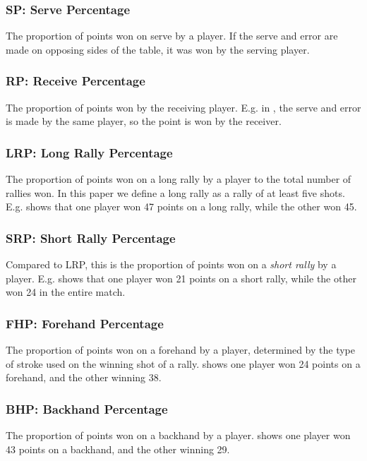 \subsubsection*{SP: Serve Percentage}\label{sec:sp}
The proportion of points won on serve by a player. 
If the serve and error are made on opposing sides of the table, it  was won by the serving player.

\subsubsection*{RP: Receive Percentage}\label{sec:rp}
The proportion of points won by the receiving player. E.g. in , the serve and error is made by the same player, so the point is won by the receiver.

\subsubsection*{LRP: Long Rally Percentage}\label{sec:lrp}
The proportion of points won on a long rally by a player to the total number of rallies won. In this paper we define a long rally as a rally of at least five shots. E.g.  shows that one player won 47 points on a long rally, while the other won 45.

\subsubsection*{SRP: Short Rally Percentage}\label{sec:srp}
Compared to LRP, this is the proportion of points won on a \textit{short rally} by a player. E.g.  shows that one player won 21 points on a short rally, while the other won 24 in the entire match.

\subsubsection*{FHP: Forehand Percentage}\label{sec:fp}
The proportion of points won on a forehand by a player, determined by the type of stroke used on the winning shot of a rally.  shows one player won 24 points on a forehand, and the other winning 38.

\subsubsection*{BHP: Backhand Percentage}\label{sec:bp}
The proportion of points won on a backhand by a player.  shows one player won 43 points on a backhand, and the other winning 29.

